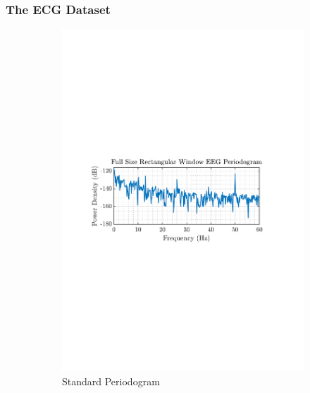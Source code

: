 \documentclass[12pt]{article}
\begin{document}
	\subsubsection{The ECG Dataset}
	\begin{figure}[H]
		\centering
		\begin{subfigure}{0.49\textwidth}
			\centering
			\includegraphics[trim={2.2cm 11.2cm 3.15cm  11.2cm}, clip, width=\textwidth]{../MATLAB/figures/q1_2b_fig01.pdf} 
			\captionsetup{justification=centering}
			\caption{Standard Periodogram}
		\end{subfigure}
		\begin{subfigure}{0.49\textwidth}
			\centering

\end{subfigure}
\end{figure}
\end{document}
